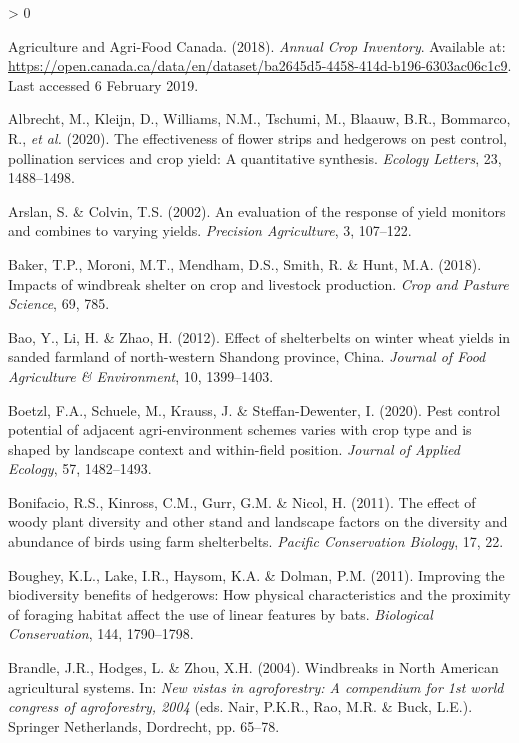 \documentclass[]{elsarticle} %
\newlength{\cslhangindent}
\newenvironment{CSLReferences}[2] %
 {%
  \setlength{\parindent}{0pt}
  \ifodd #1 \everypar{\setlength{\hangindent}{\cslhangindent}}\ignorespaces\fi
  \ifnum #2 > 0
  \setlength{\parskip}{#2\baselineskip}
  \fi
 }%
 {}
\begin{document}
\hypertarget{refs}{}
\begin{CSLReferences}{1}{0}
\leavevmode\hypertarget{ref-AAFC_data}{}%
Agriculture and Agri-Food Canada. (2018). \emph{{Annual Crop Inventory}}. Available at: \url{https://open.canada.ca/data/en/dataset/ba2645d5-4458-414d-b196-6303ac06c1c9}. Last accessed 6 February 2019.

\leavevmode\hypertarget{ref-albrecht2020}{}%
Albrecht, M., Kleijn, D., Williams, N.M., Tschumi, M., Blaauw, B.R., Bommarco, R., \emph{et al.} (2020). The effectiveness of flower strips and hedgerows on pest control, pollination services and crop yield: A quantitative synthesis. \emph{Ecology Letters}, 23, 1488--1498.

\leavevmode\hypertarget{ref-arslan2002}{}%
Arslan, S. \& Colvin, T.S. (2002). An evaluation of the response of yield monitors and combines to varying yields. \emph{Precision Agriculture}, 3, 107--122.

\leavevmode\hypertarget{ref-baker2018}{}%
Baker, T.P., Moroni, M.T., Mendham, D.S., Smith, R. \& Hunt, M.A. (2018). Impacts of windbreak shelter on crop and livestock production. \emph{Crop and Pasture Science}, 69, 785.

\leavevmode\hypertarget{ref-bao2012}{}%
Bao, Y., Li, H. \& Zhao, H. (2012). Effect of shelterbelts on winter wheat yields in sanded farmland of north-western {Shandong} province, {China}. \emph{Journal of Food Agriculture \& Environment}, 10, 1399--1403.

\leavevmode\hypertarget{ref-boetzl2020}{}%
Boetzl, F.A., Schuele, M., Krauss, J. \& Steffan-Dewenter, I. (2020). Pest control potential of adjacent agri-environment schemes varies with crop type and is shaped by landscape context and within-field position. \emph{Journal of Applied Ecology}, 57, 1482--1493.

\leavevmode\hypertarget{ref-bonifacio2011}{}%
Bonifacio, R.S., Kinross, C.M., Gurr, G.M. \& Nicol, H. (2011). The effect of woody plant diversity and other stand and landscape factors on the diversity and abundance of birds using farm shelterbelts. \emph{Pacific Conservation Biology}, 17, 22.

\leavevmode\hypertarget{ref-boughey2011}{}%
Boughey, K.L., Lake, I.R., Haysom, K.A. \& Dolman, P.M. (2011). Improving the biodiversity benefits of hedgerows: How physical characteristics and the proximity of foraging habitat affect the use of linear features by bats. \emph{Biological Conservation}, 144, 1790--1798.

\leavevmode\hypertarget{ref-brandle2004}{}%
Brandle, J.R., Hodges, L. \& Zhou, X.H. (2004). Windbreaks in {North American} agricultural systems. In: \emph{New vistas in agroforestry: A compendium for 1st world congress of agroforestry, 2004} (eds. Nair, P.K.R., Rao, M.R. \& Buck, L.E.). Springer Netherlands, Dordrecht, pp. 65--78.


\end{CSLReferences}
\end{document}
